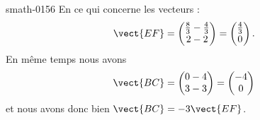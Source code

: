\begin{corrige}{smath-0156}
En ce qui concerne les vecteurs :
\begin{equation}
    \vect{ EF }=\begin{pmatrix}
        \frac{ 8 }{ 3 }-\frac{ 4 }{ 3 }    \\ 
        2-2    
    \end{pmatrix}=\begin{pmatrix}
        \frac{ 4 }{ 3 }    \\ 
        0    
    \end{pmatrix}.
\end{equation}
En même temps nous avons
\begin{equation}
    \vect{ BC }=\begin{pmatrix}
        0-4    \\ 
        3-3    
    \end{pmatrix}=\begin{pmatrix}
        -4    \\ 
        0    
    \end{pmatrix}
\end{equation}
et nous avons donc bien \( \vect{ BC }=-3\vect{ EF }\).


\end{corrige}
